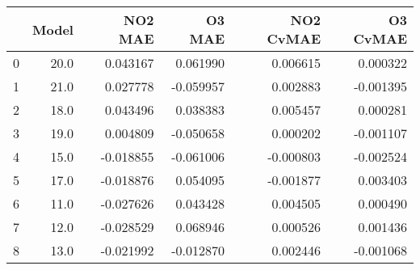 \begin{tabular}{lrrrrr}
\toprule
{} &  Model &   NO2 MAE &    O3 MAE &  NO2 CvMAE &  O3 CvMAE \\
\midrule
0 &   20.0 &  0.043167 &  0.061990 &   0.006615 &  0.000322 \\
1 &   21.0 &  0.027778 & -0.059957 &   0.002883 & -0.001395 \\
2 &   18.0 &  0.043496 &  0.038383 &   0.005457 &  0.000281 \\
3 &   19.0 &  0.004809 & -0.050658 &   0.000202 & -0.001107 \\
4 &   15.0 & -0.018855 & -0.061006 &  -0.000803 & -0.002524 \\
5 &   17.0 & -0.018876 &  0.054095 &  -0.001877 &  0.003403 \\
6 &   11.0 & -0.027626 &  0.043428 &   0.004505 &  0.000490 \\
7 &   12.0 & -0.028529 &  0.068946 &   0.000526 &  0.001436 \\
8 &   13.0 & -0.021992 & -0.012870 &   0.002446 & -0.001068 \\
\bottomrule
\end{tabular}

